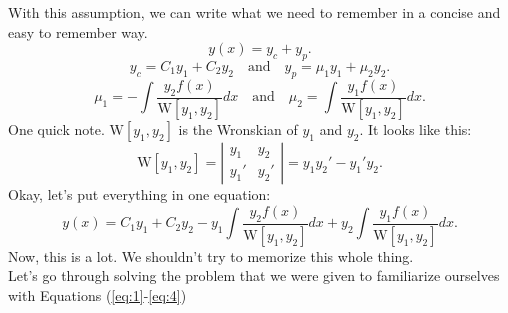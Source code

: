 \documentclass[a4paper,12pt]{article} %
\begin{document}
With this assumption, we can write what we need to remember in a concise and easy to remember way.
\begin{equation}
	y(x) = y_c + y_p. \label{eq:1}
\end{equation}
\begin{equation}
	y_c = C_1y_1 + C_2y_2  \quad \text{and}\quad y_p = \mu_1y_1 + \mu_2y_2. \label{eq:2}
\end{equation}
\begin{equation}
	\mu_1 = -\int \frac{y_2f(x)}{\mathrm{W}[y_1,y_2]}dx \quad\text{and} \quad \mu_2 = \int \frac{y_1f(x)}{\mathrm{W}[y_1,y_2]}dx. \label{eq:3}
\end{equation}
One quick note. $\mathrm{W}[y_1,y_2]$ is the Wronskian of $y_1$ and $y_2$. It looks like this:
\begin{equation}
	\mathrm{W}[y_1,y_2] = \left|\begin{matrix}
	y_1 & y_2 \\
	y_1' & y_2'
\end{matrix}\right| = y_1y_2' - y_1'y_2. \label{eq:4}
\end{equation}
Okay, let's put everything in one equation:
$$ \boxed{y(x) = C_1y_1 + C_2y_2 -y_1\int \frac{y_2f(x)}{\mathrm{W}[y_1,y_2]}dx + y_2 \int \frac{y_1f(x)}{\mathrm{W}[y_1,y_2]}dx.} $$
Now, this is a lot. We shouldn't try to memorize this whole thing.\\

Let's go through solving the problem that we were given to familiarize ourselves with Equations (\ref{eq:1}-\ref{eq:4})\\
\end{document}
